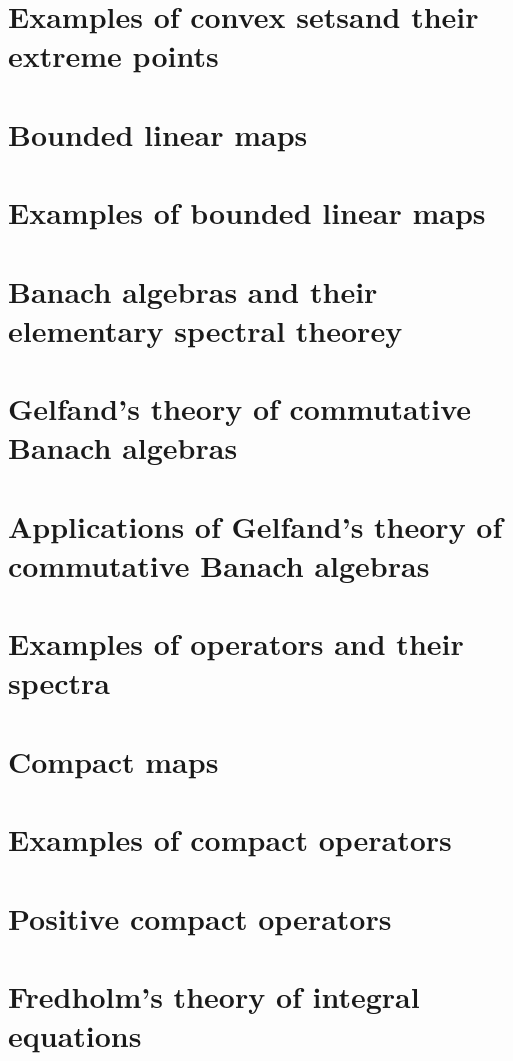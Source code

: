 \documentclass[11pt]{elegantbook}
\begin{document}
\chapter{Examples of convex setsand their extreme points}

\chapter{Bounded linear maps}

\chapter{Examples of bounded linear maps}

\chapter{Banach algebras and their elementary spectral theorey}

\chapter{Gelfand's theory of commutative Banach algebras}

\chapter{Applications of Gelfand's theory of commutative Banach algebras}

\chapter{Examples of operators and their spectra}

\chapter{Compact maps}

\chapter{Examples of compact operators}

\chapter{Positive compact operators}

\chapter{Fredholm's theory of integral equations}
\end{document}
